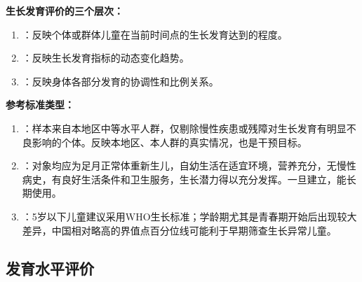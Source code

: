 \begin{defbox}
\textbf{生长发育评价的三个层次：}

\begin{enumerate}[leftmargin=*]
    \item {}：反映个体或群体儿童在当前时间点的生长发育达到的程度。
    \item {}：反映生长发育指标的动态变化趋势。
    \item {}：反映身体各部分发育的协调性和比例关系。
\end{enumerate}

\textbf{参考标准类型：}

\begin{enumerate}[leftmargin=*]
    \item {}：样本来自本地区中等水平人群，仅剔除慢性疾患或残障对生长发育有明显不良影响的个体。反映本地区、本人群的真实情况，也是干预目标。
    \item {}：对象均应为足月正常体重新生儿，自幼生活在适宜环境，营养充分，无慢性病史，有良好生活条件和卫生服务，生长潜力得以充分发挥。一旦建立，能长期使用。
    \item {}：5岁以下儿童建议采用WHO生长标准；学龄期尤其是青春期开始后出现较大差异，中国相对略高的界值点百分位线可能利于早期筛查生长异常儿童。
\end{enumerate}
\end{defbox}

\subsection{发育水平评价}

